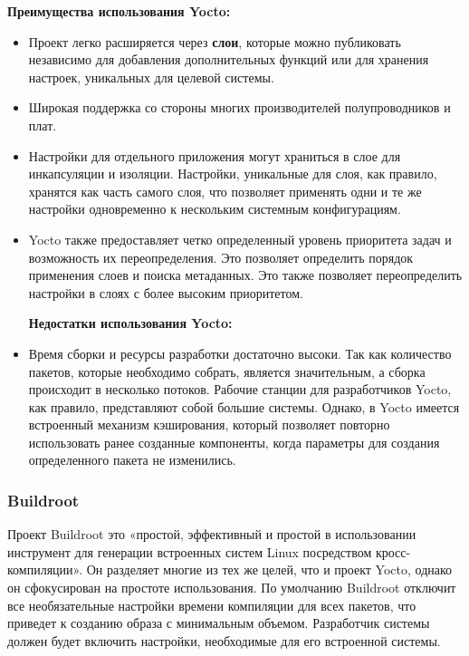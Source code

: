 \textbf{Преимущества использования Yocto:}
\begin{itemize}
  \item Проект легко расширяется через \textbf{слои}, которые можно публиковать независимо для добавления дополнительных функций или для хранения настроек, уникальных для целевой системы.
  \item Широкая поддержка со стороны многих производителей полупроводников и плат.
  \item Настройки для отдельного приложения могут храниться в слое для инкапсуляции и изоляции. Настройки, уникальные для слоя, как правило, хранятся как часть самого слоя, что позволяет применять одни и те же настройки одновременно к нескольким системным конфигурациям.
  \item Yocto также предоставляет четко определенный уровень приоритета задач и возможность их переопределения. Это позволяет определить порядок применения слоев и поиска метаданных. Это также позволяет переопределить настройки в слоях с более высоким приоритетом.

\textbf{Недостатки использования Yocto:}
\end{itemize}
\begin{itemize}
  \item Время сборки и ресурсы разработки достаточно высоки\cite{YOCTO}. Так как количество пакетов, которые необходимо собрать, является значительным, а сборка происходит в несколько потоков. Рабочие станции для разработчиков Yocto, как правило, представляют собой большие системы. Однако, в Yocto имеется встроенный механизм кэширования, который позволяет повторно использовать ранее созданные компоненты, когда параметры для создания определенного пакета не изменились.
\end{itemize}
\newpage
\subsubsection{Buildroot}
Проект Buildroot это «простой, эффективный и простой в использовании инструмент для генерации встроенных систем Linux посредством кросс-компиляции»\cite{BUILDROOT}.
Он разделяет многие из тех же целей, что и проект Yocto, однако он сфокусирован на простоте использования.
По умолчанию Buildroot отключит все необязательные настройки времени компиляции для всех пакетов, что приведет к созданию образа с минимальным объемом.
Разработчик системы должен будет включить настройки, необходимые для его встроенной системы.

